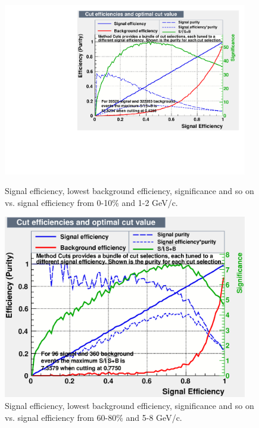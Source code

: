 \begin{figure}[htbp]
\begin{minipage}[htbp]{0.52\linewidth}
\centering
\includegraphics[width=0.95\textwidth]{figure/Run14_D0HFT/cent0_10_pt1_2.pdf}
\caption{Signal efficiency, lowest background efficiency, significance and so on vs. signal efficiency from 0-10\% and 1-2 GeV/c.\label{fig:effPass_0_10}}
\end{minipage}
\hfill
\begin{minipage}[htbp]{0.52\linewidth}
\centering
\includegraphics[width=0.95\textwidth]{figure/Run14_D0HFT/cent60_80_pt5_8.eps} 
\caption{Signal efficiency, lowest background efficiency, significance and so on vs. signal efficiency from 60-80\% and 5-8 GeV/c.\label{fig:effPass_60_80}}
\end{minipage}
\end{figure}

